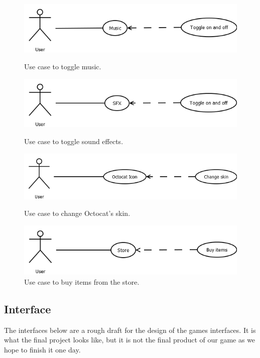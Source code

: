 \documentclass[10pt,conference,onecolumn,compsoc]{IEEEtran}
\begin{document}
\begin{figure}[h!]
\centering
\includegraphics[scale=.5]{Music.png}
\caption{Use case to toggle music.}
\label{Music}

\includegraphics[scale=.5]{SFX.png}
\caption{Use case to toggle sound effects.}
\label{SFX}

\includegraphics[scale=.5]{Octocat_Icon.png}
\caption{Use case to change Octocat's skin.}
\label{Skin}

\includegraphics[scale=.5]{Store.png}
\caption{Use case to buy items from the store.}
\label{Store}
\end{figure}

\subsection{Interface}
The interfaces below are a rough draft for the design of the games interfaces. It is what the final project looks like, but it is not the final product of our game as we hope to finish it one day.

\clearpage
\end{document}
